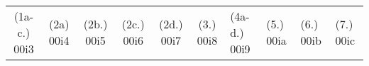 \begin{eocexercises}{}
\begin{enumerate}[noitemsep, label=\textbf{\arabic*}. ]
\end{enumerate}


\par \practiceinfo\\

\begin{tabular}[h]{cccccc}
 (1a-c.) 00i3& (2a) 00i4&  (2b.) 00i5& (2c.) 00i6& (2d.) 00i7&  (3.) 00i8&  (4a-d.) 00i9&  (5.) 00ia&  (6.) 00ib& (7.) 00ic
\end{tabular}

\end{eocexercises}
